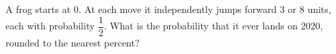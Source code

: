 A frog starts at 0. At each move it independently jumps forward 3 or 8 units, each with probability $\dfrac{1}{2}$. What is the probability that it ever lands on 2020, rounded to the nearest percent?
